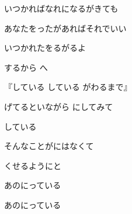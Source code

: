\documentclass[14pt]{extreport}
\begin{document}
{\item
  いつかればなれになるがきても
  \jisho{}

  あなたをったがあればそれでいい
  \jisho{}

  いつかれたをるがるよ
  \jisho{}

  するから へ
  \jisho{}

\item
  『している している がわるまで』
  \jisho{}

  げてるといながら にしてみて
  \jisho{}

  している
  \jisho{}

  そんなことがにはなくて
  \jisho{}

  くせるようにと
  \jisho{}

  あのにっている
  \jisho{}

\item
  あのにっている
  \jisho{}


}
\end{document}
